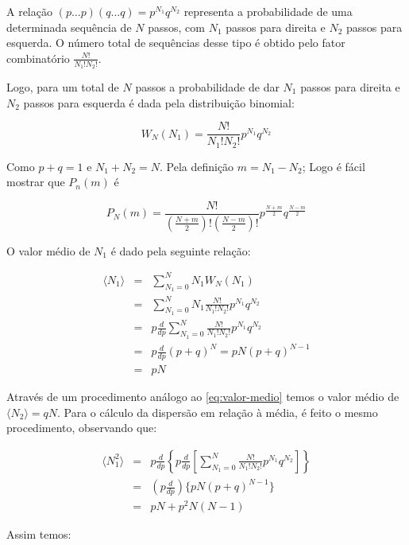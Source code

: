 \documentclass[brazil,ruledheader]{abnt}
\begin{document}
A relação $(p\dots p)(q\dots q)=p^{N_1}q^{N_2}$ representa a probabilidade de
uma determinada sequência de $N$ passos, com  $N_1$ passos para direita e $N_2$
passos para esquerda. O número total de sequências desse tipo é obtido pelo
fator combinatório $\frac{N!}{N_1!N_2!}$.

Logo, para um total de $N$ passos a probabilidade de dar $N_1$ passos para
direita e $N_2$ passos para esquerda é dada pela distribuição binomial:

\begin{equation}
\label{eq:distribuicao-binomial}
W_N(N_1)=\frac{N!}{N_1!N_2!}p^{N_1}q^{N_2}
\end{equation}

Como $p+q=1$ e $N_1+N_2=N$. Pela definição $m=N_1-N_2$; Logo é fácil mostrar
que $P_n(m)$ é

\begin{equation}
\label{eq:distribuicao-binomial2}
P_N(m)=\frac{N!}{\left(
\frac{N+m}{2}\right)!\left(\frac{N-m}{2}\right)!}p^{\frac{N+m}{2}}q^{\frac{N-m}{
2}}
\end{equation}

O valor médio de $N_1$ é dado pela seguinte relação:

\begin{eqnarray}
\label{eq:valor-medio}
\langle N_1 \rangle &=& \sum_{N_1=0}^N N_1 W_N(N_1) \nonumber\\
&=& \sum_{N_1=0}^N N_1\frac{N!} {N_1!N_2!} p^{N_1}q^{N_2}\nonumber\\
&=& p \frac{d}{dp} \sum_{N_1=0}^N \frac{N!}{N_1!N_2!}p^{N_1}q^{N_2}\nonumber\\
&=& p\frac{d}{dp}(p+q)^N=pN(p+q)^{ N-1}\nonumber\\
&=& pN
\end{eqnarray}

Através de um procedimento análogo ao \ref{eq:valor-medio} temos o valor
médio
de $\langle N_2 \rangle = qN$. Para o cálculo da dispersão em relação à média,
é feito o mesmo procedimento, observando que:

\begin{eqnarray}
\label{eq:valor-medio-N2}
\langle N_1^2 \rangle &=& p\frac{d}{dp}\left\{
p\frac{d}{dp}\left[\sum_{N_1=0}^N \frac{N!}{N_1!N_2!}p^{N_1}q^{N_2} \right]
\right\} \nonumber \\
&=& \left( p\frac{d}{dp}\right) \{ pN(p+q)^{N-1}\} \nonumber \\
&=& pN+p^2N(N-1)
\end{eqnarray}

Assim temos:
\end{document}
